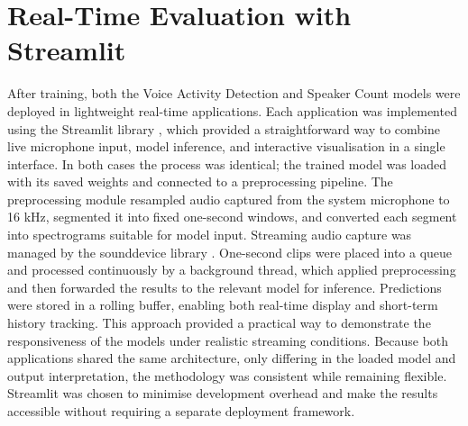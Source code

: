 \section{Real-Time Evaluation with Streamlit}
After training, both the Voice Activity Detection and Speaker Count models were deployed in lightweight real-time applications. Each application was implemented using the Streamlit library \cite{streamlit}, which provided a straightforward way to combine live microphone input, model inference, and interactive visualisation in a single interface. In both cases the process was identical; the trained model was loaded with its saved weights and connected to a preprocessing pipeline. The preprocessing module resampled audio captured from the system microphone to 16 kHz, segmented it into fixed one-second windows, and converted each segment into spectrograms suitable for model input. \newline\newline Streaming audio capture was managed by the sounddevice library \cite{sounddevice}. One-second clips were placed into a queue and processed continuously by a background thread, which applied preprocessing and then forwarded the results to the relevant model for inference. Predictions were stored in a rolling buffer, enabling both real-time display and short-term history tracking. This approach provided a practical way to demonstrate the responsiveness of the models under realistic streaming conditions. Because both applications shared the same architecture, only differing in the loaded model and output interpretation, the methodology was consistent while remaining flexible. Streamlit was chosen to minimise development overhead and make the results accessible without requiring a separate deployment framework.